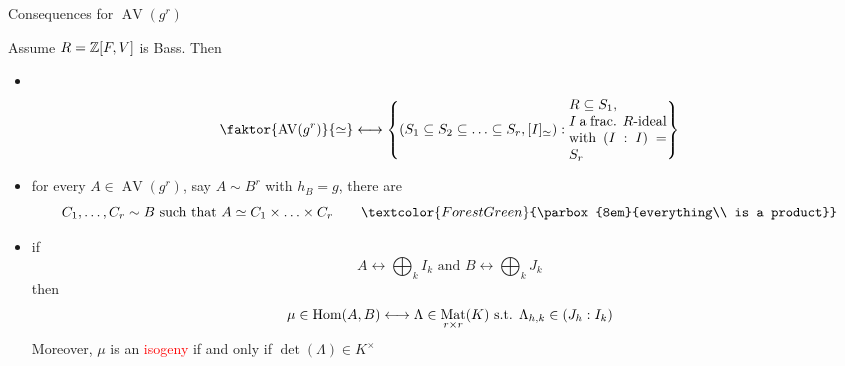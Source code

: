 \documentclass[usenames,dvipsnames]{beamer}
\DeclareMathOperator{\AV}{AV}
\DeclareMathOperator{\Mat}{Mat}
\newcommand{\red}[1]{\textcolor{red}{#1}}
\newcommand{\green}[1]{\textcolor{ForestGreen}{#1}}
\begin{document}
\begin{frame}{ Consequences for $\AV(g^r)$ }
\begin{corollary}
Assume $R=\mathbb{Z}[F,V]$ is Bass.
Then
 \begin{itemize}
  \pause \item \ 
  \vspace{-1em}
  \[ \faktor{\AV(g^r)}{ \simeq } \longleftrightarrow \set{ (S_1\subseteq S_2 \subseteq \ldots \subseteq S_r , [I]_{\simeq}) : \parbox{7em}{$R\subseteq S_1$,\\ $I$ a frac. $R$-ideal with $(I:I)=S_r$}  } \]
  \pause \item for every $A\in \AV(g^r)$, say $A\sim B^r$ with $h_B=g$, there are 
  \vspace{-1em}
  \[C_1,\ldots,C_r \sim B \text{ such that } A \simeq C_1\times \ldots \times C_r \qquad\green{\parbox{8em}{everything\\ is a product}} \]
  \vspace{-1em}
  \pause \item if 
  \vspace{-1em}
  \[ A \longleftrightarrow \bigoplus_k I_k \text{ and } B \longleftrightarrow \bigoplus_k J_k \]
  \vspace{-1em}
  then 
  \vspace{-1em}
  \[ \mu \in \Hom(A,B) \longleftrightarrow \Lambda \in \Mat_{r\times r}(K) \text{ s.t. } \Lambda_{h,k}\in (J_h:I_k) \]
  \pause Moreover, $\mu$ is an \red{isogeny} if and only if $\det(\Lambda) \in K^\times$
 \end{itemize}
\end{corollary}
\end{frame}
\end{document}
